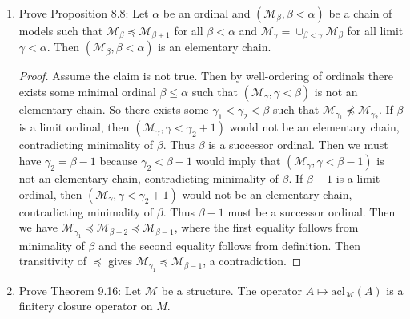 \documentclass{article}
\begin{document}
\begin{enumerate}[label={\bf Q\arabic*:}]
  \item Prove Proposition 8.8: Let $\alpha$ be an ordinal and
    $(\mathcal{M}_\beta,\beta<\alpha)$ be a chain of models such that
    $\mathcal{M}_\beta\preceq\mathcal{M}_{\beta+1}$ for all $\beta<\alpha$
    and $\mathcal{M}_\gamma=\cup_{\beta<\gamma}\mathcal{M}_\beta$ for all
    limit $\gamma<\alpha$. Then $(\mathcal{M}_\beta,\beta<\alpha)$ is an
    elementary chain.

    \begin{proof}
      Assume the claim is not true. Then by well-ordering of ordinals there
      exists some minimal ordinal $\beta\leq\alpha$ such that
      $(\mathcal{M}_\gamma,\gamma<\beta)$ is not an elementary chain. So
      there exists some $\gamma_1<\gamma_2<\beta$ such that
      $\mathcal{M}_{\gamma_1}\not\preceq\mathcal{M}_{\gamma_2}$. If $\beta$
      is a limit ordinal, then $(\mathcal{M}_\gamma,\gamma<\gamma_2+1)$
      would not be an elementary chain, contradicting minimality of
      $\beta$. Thus $\beta$ is a successor ordinal. Then we must have
      $\gamma_2=\beta-1$ because $\gamma_2<\beta-1$ would imply that
      $(\mathcal{M}_\gamma,\gamma<\beta-1)$ is not an elementary chain,
      contradicting minimality of $\beta$. If $\beta-1$ is a limit ordinal,
      then $(\mathcal{M}_\gamma,\gamma<\gamma_2+1)$ would not be an
      elementary chain, contradicting minimality of $\beta$. Thus $\beta-1$
      must be a successor ordinal. Then we have $\mathcal{M}_{\gamma_1}
      \preceq\mathcal{M}_{\beta-2} \preceq\mathcal{M}_{\beta-1}$, where the
      first equality follows from minimality of $\beta$ and the second
      equality follows from definition. Then transitivity of $\preceq$
      gives $\mathcal{M}_{\gamma_1}\preceq\mathcal{M}_{\beta-1}$, a
      contradiction.
    \end{proof}

  \item Prove Theorem 9.16: Let $\mathcal{M}$ be a structure. The operator
    $A\mapsto\text{acl}_\mathcal{M}(A)$ is a finitery closure operator on
    $M$.


\end{enumerate}
\end{document}
